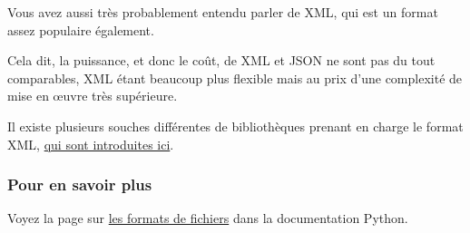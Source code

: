    Vous avez aussi très probablement entendu parler de XML, qui est un
format assez populaire également.

Cela dit, la puissance, et donc le coût, de XML et JSON ne sont pas du
tout comparables, XML étant beaucoup plus flexible mais au prix d'une
complexité de mise en œuvre très supérieure.

Il existe plusieurs souches différentes de bibliothèques prenant en
charge le format XML,
\href{https://docs.python.org/3/library/xml.html}{qui sont introduites
ici}.

    \hypertarget{pour-en-savoir-plus}{%
\subsubsection{Pour en savoir plus}\label{pour-en-savoir-plus}}

    Voyez la page sur
\href{https://docs.python.org/3/library/fileformats.html}{les formats de
fichiers} dans la documentation Python.


    
    
    
